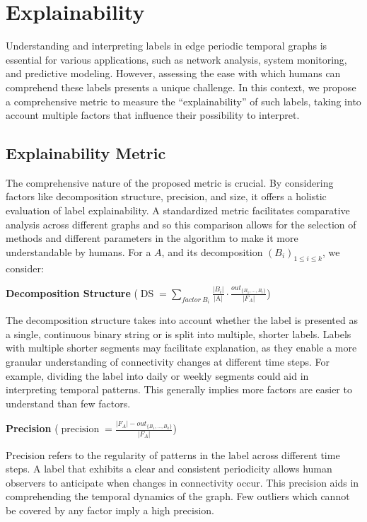 \chapter{Explainability}

Understanding and interpreting labels in edge periodic temporal graphs is essential for various applications, such as network analysis, system monitoring, and predictive modeling. However, assessing the ease with which humans can comprehend these labels presents a unique challenge. In this context, we propose a comprehensive metric to measure the \enquote{explainability} of such labels, taking into account multiple factors that influence their possibility to interpret.

\section{Explainability Metric}
The comprehensive nature of the proposed metric is crucial. By considering factors like decomposition structure, precision, and size, it offers a holistic evaluation of label explainability. A standardized metric facilitates comparative analysis across different graphs and so this comparison allows for the selection of methods and different parameters in the algorithm to make it more understandable by humans. For a \DFA $A$, and its decomposition $(B_i)_{1 \leq i \leq k}$, we consider:

\textbf{Decomposition Structure} ($\operatorname{DS} = \sum\limits_{factor~ B_i}\frac{|B_i|}{\text{|A|}} \cdot \frac{out_{\{B_1,\dots,B_i\}}}{|F_A|}$)

The decomposition structure takes into account whether the label is presented as a single, continuous binary string or is split into multiple, shorter labels. Labels with multiple shorter segments may facilitate explanation, as they enable a more granular understanding of connectivity changes at different time steps. For example, dividing the label into daily or weekly segments could aid in interpreting temporal patterns. This generally implies more factors are easier to understand than few factors.

\textbf{Precision} ($\operatorname{precision} = \frac{|F_A| - out_{\{B_1,\dots,B_k\}}}{|F_A|}$)

Precision refers to the regularity of patterns in the label across different time steps. A label that exhibits a clear and consistent periodicity allows human observers to anticipate when changes in connectivity occur. This precision aids in comprehending the temporal dynamics of the graph. Few outliers which cannot be covered by any factor imply a high precision.

